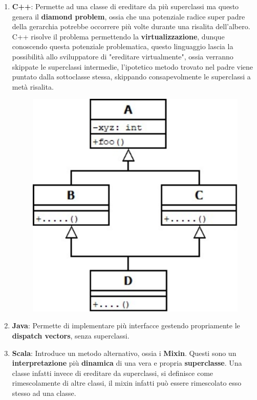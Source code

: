 \documentclass{article}
\begin{document}
\begin{enumerate}
    \item \textbf{C++}: Permette ad una classe di ereditare da più superclassi ma questo genera il \textbf{diamond problem}, ossia che una potenziale radice super padre della gerarchia potrebbe occorrere più volte durante una risalita dell'albero. C++ risolve il problema permettendo la \textbf{virtualizzazione}, dunque conoscendo questa potenziale problematica, questo linguaggio lascia la possibilità allo sviluppatore di "ereditare virtualmente", ossia verranno skippate le superclassi intermedie, l'ipotetico metodo trovato nel padre viene puntato dalla sottoclasse stessa, skippando consapevolmente le superclassi a metà risalita.
    \begin{figure}[htbp]
        \center
        \includegraphics[scale=0.3]{img/virtualizzazione.png}
    \end{figure}
    \item \textbf{Java}: Permette di implementare più interfacce gestendo propriamente le \textbf{dispatch vectors}, senza superclassi.
    \item \textbf{Scala}: Introduce un metodo alternativo, ossia i \textbf{Mixin}. Questi sono un \textbf{interpretazione} più \textbf{dinamica} di una vera e propria \textbf{superclasse}. Una classe infatti invece di ereditare da superclassi, si definisce come rimescolamente di altre classi, il mixin infatti può essere rimescolato esso stesso ad una classe.
    

\end{enumerate}
\end{document}
